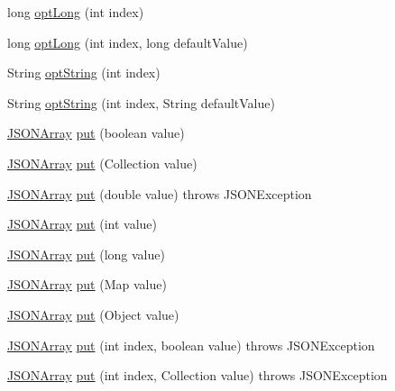 \begin{DoxyCompactItemize}
\item 
long \hyperlink{classorg_1_1json_1_1_j_s_o_n_array_af38b848063c07f2a3218592bb595e722}{opt\-Long} (int index)
\item 
long \hyperlink{classorg_1_1json_1_1_j_s_o_n_array_a2c6ccec4ce5ab42e192e5686bc0ac03b}{opt\-Long} (int index, long default\-Value)
\item 
String \hyperlink{classorg_1_1json_1_1_j_s_o_n_array_aae00b0b37711915293a389a597f4adf7}{opt\-String} (int index)
\item 
String \hyperlink{classorg_1_1json_1_1_j_s_o_n_array_a81407977272f634afe7d278ecb9c44b5}{opt\-String} (int index, String default\-Value)
\item 
\hyperlink{classorg_1_1json_1_1_j_s_o_n_array}{J\-S\-O\-N\-Array} \hyperlink{classorg_1_1json_1_1_j_s_o_n_array_a54cc64e03735749abb69a05cf5b3ed68}{put} (boolean value)
\item 
\hyperlink{classorg_1_1json_1_1_j_s_o_n_array}{J\-S\-O\-N\-Array} \hyperlink{classorg_1_1json_1_1_j_s_o_n_array_a44f8b70a1f4d574bb4c10270c62f67bf}{put} (Collection value)
\item 
\hyperlink{classorg_1_1json_1_1_j_s_o_n_array}{J\-S\-O\-N\-Array} \hyperlink{classorg_1_1json_1_1_j_s_o_n_array_a0640a8fabd23294c4972a7884b1e3714}{put} (double value)  throws J\-S\-O\-N\-Exception 
\item 
\hyperlink{classorg_1_1json_1_1_j_s_o_n_array}{J\-S\-O\-N\-Array} \hyperlink{classorg_1_1json_1_1_j_s_o_n_array_a86a8ba6ff68f50faaad5c7070ef91f64}{put} (int value)
\item 
\hyperlink{classorg_1_1json_1_1_j_s_o_n_array}{J\-S\-O\-N\-Array} \hyperlink{classorg_1_1json_1_1_j_s_o_n_array_a3dd194b7438a41505fe1ff4cee0cd3fd}{put} (long value)
\item 
\hyperlink{classorg_1_1json_1_1_j_s_o_n_array}{J\-S\-O\-N\-Array} \hyperlink{classorg_1_1json_1_1_j_s_o_n_array_aa419be334b3ea1d04c3d4ba957f92ac8}{put} (Map value)
\item 
\hyperlink{classorg_1_1json_1_1_j_s_o_n_array}{J\-S\-O\-N\-Array} \hyperlink{classorg_1_1json_1_1_j_s_o_n_array_a184c04f20d200b83da5f70c05651949c}{put} (Object value)
\item 
\hyperlink{classorg_1_1json_1_1_j_s_o_n_array}{J\-S\-O\-N\-Array} \hyperlink{classorg_1_1json_1_1_j_s_o_n_array_a40deb37f82b54a44476a6a162ba55864}{put} (int index, boolean value)  throws J\-S\-O\-N\-Exception 
\item 
\hyperlink{classorg_1_1json_1_1_j_s_o_n_array}{J\-S\-O\-N\-Array} \hyperlink{classorg_1_1json_1_1_j_s_o_n_array_a378431a521ca31a67ea967754ef596f8}{put} (int index, Collection value)  throws J\-S\-O\-N\-Exception 

\end{DoxyCompactItemize}
